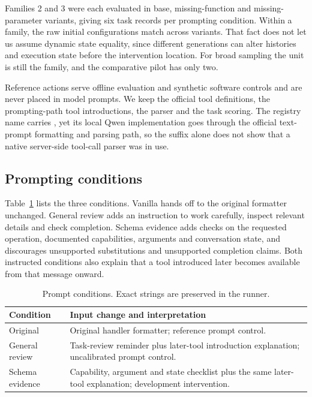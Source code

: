 \documentclass[conference]{IEEEtran}
\newcommand{\code}[1]{\texttt{\detokenize{#1}}}
\begin{document}
Families 2 and 3 were each evaluated in base, missing-function and missing-parameter variants, giving six task records per prompting condition. Within a family, the raw initial configurations match across variants. That fact does not let us assume dynamic state equality, since different generations can alter histories and execution state before the intervention location. For broad sampling the unit is still the family, and the comparative pilot has only two.

Reference actions serve offline evaluation and synthetic software controls and are never placed in model prompts. We keep the official tool definitions, the prompting-path tool introductions, the parser and the task scoring. The registry name carries \code{-FC}, yet its local Qwen implementation goes through the official text-prompt formatting and parsing path, so the suffix alone does not show that a native server-side tool-call parser was in use.

\subsection{Prompting conditions}
Table~\ref{tab:conditions} lists the three conditions. Vanilla hands off to the original formatter unchanged. General review adds an instruction to work carefully, inspect relevant details and check completion. Schema evidence adds checks on the requested operation, documented capabilities, arguments and conversation state, and discourages unsupported substitutions and unsupported completion claims. Both instructed conditions also explain that a tool introduced later becomes available from that message onward.

\begin{table}[t]
\caption{Prompt conditions. Exact strings are preserved in the runner.}
\label{tab:conditions}\centering\small
\begin{tabular}{p{}p{}}\toprule
Condition & Input change and interpretation\\\midrule
Original & Original handler formatter; reference prompt control.\\
General review & Task-review reminder plus later-tool introduction explanation; uncalibrated prompt control.\\
Schema evidence & Capability, argument and state checklist plus the same later-tool explanation; development intervention.\\\bottomrule
\end{tabular}
\end{table}
\end{document}
